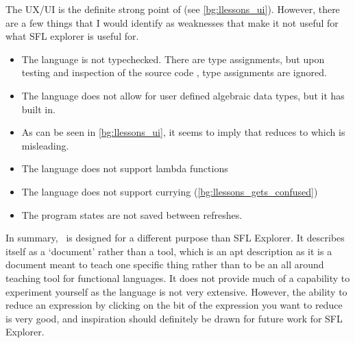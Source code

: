 The UX/UI is the definite strong point of \llessons (see \ref{bg:llessons_ui}).  However, there are a few things that I would identify as weaknesses that make it not useful for what SFL explorer is useful for. 

\begin{itemize}
    \item The language is not typechecked. There are type assignments, but upon testing and inspection of the source code \cite{lambdalessonsgithub}, type assignments are ignored. 
    \item The language does not allow for user defined algebraic data types, but it has  built in. 
    \item As can be seen in \ref{bg:llessons_ui}, it seems to imply that  reduces to \sflinline{[x, y]} which is misleading. 
    \item The language does not support lambda functions
    \item The language does not support currying (\ref{bg:llessons_gets_confused})
    \item The program states are not saved between refreshes.
\end{itemize} 

In summary, \llessons\ is designed for a different purpose than SFL Explorer. It describes itself as a `document' \cite{lambdalessons} rather than a tool, which is an apt description as it is a document meant to teach one specific thing rather than to be an all around teaching tool for functional languages. It does not provide much of a capability to experiment yourself as the language is not very extensive. However, the ability to reduce an expression by clicking on the bit of the expression you want to reduce is very good, and inspiration should definitely be drawn for future work for SFL Explorer.  


